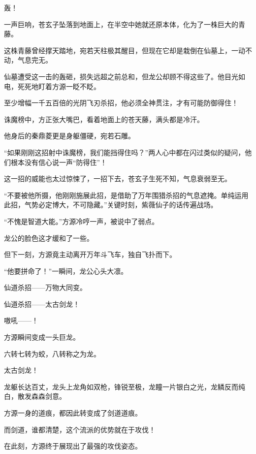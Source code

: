 \begin{this_body}
轰！

一声巨响，苍玄子坠落到地面上，在半空中她就还原本体，化为了一株巨大的青藤。

这株青藤曾经撑天踏地，宛若天柱极其醒目，但现在它却是栽倒在仙墓上，一动不动，气息完无。

仙墓遭受这一击的轰砸，损失远超之前总和，但龙公却顾不得这些了。他目光如电，死死地盯着方源一眨不眨。

至少增幅一千五百倍的光阴飞刃杀招，他必须全神贯注，才有可能防御得住！

诛魔榜中，方正张大嘴巴，看着地面上的苍天藤，满头都是冷汗。

他身后的秦鼎菱更是身躯僵硬，宛若石雕。

“如果刚刚这招射中诛魔榜，我们能挡得住吗？”两人心中都在闪过类似的疑问，他们根本没有信心说一声“防得住”！

这一招的威能也太过惊悚了，一招下去，苍玄子生死不知，气息衰弱至无。

“不要被他所摄，他刚刚施展此招，是借助了万年围猎杀招的气息遮掩。单纯运用此招，气势必定博大，不可隐藏。”关键时刻，紫薇仙子的话传遍战场。

“不愧是智道大能。”方源冷哼一声，被说中了弱点。

龙公的脸色这才缓和了一些。

但下一刻，方源竟主动离开万年斗飞车，独自飞扑而下。

“他要拼命了！”一瞬间，龙公心头大凛。

仙道杀招——万物大同变。

仙道杀招——太古剑龙！

嗷吼——！

方源瞬间变成一头巨龙。

六转七转为蛟，八转称之为龙。

太古剑龙！

龙躯长达百丈，龙头上龙角如双枪，锋锐至极，龙瞳一片银白之光，龙鳞反而纯白，散发森森剑意。

方源一身的道痕，都因此转变成了剑道道痕。

而剑道，谁都清楚，这个流派的优势就在于攻伐！

在此刻，方源终于展现出了最强的攻伐姿态。

\end{this_body}

